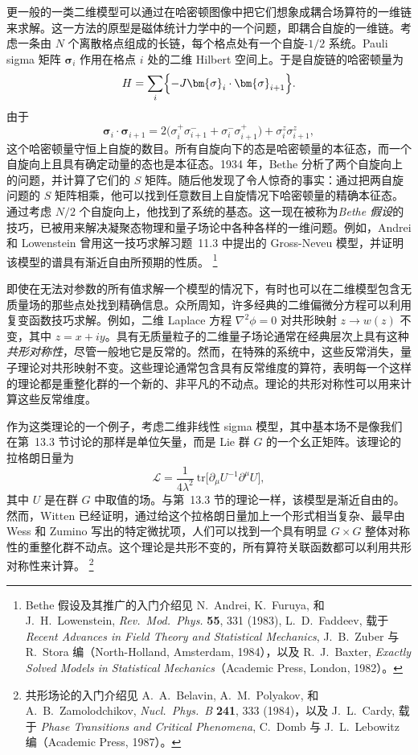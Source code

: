 更一般的一类二维模型可以通过在哈密顿图像中把它们想象成耦合场算符的一维链来求解。这一方法的原型是磁体统计力学中的一个问题，即耦合自旋的一维链。考虑一条由 $N$ 个离散格点组成的长链，每个格点处有一个自旋-$1/2$ 系统。Pauli sigma 矩阵 $\bm{\sigma}_i$ 作用在格点 $i$ 处的二维 Hilbert 空间上。于是自旋链的哈密顿量为
\begin{equation}
  H = \sum_i \Bigl\{ -J\bm{\sigma}_i\cdot\bm{\sigma}_{i+1} \Bigr\} .
  \label{eq:22.15}
\end{equation}
由于
\begin{equation}
  \bm{\sigma}_i\cdot\bm{\sigma}_{i+1} = 2\bigl( \sigma^+_i\sigma^-_{i+1}
    + \sigma^-_i\sigma^+_{i+1} \bigr) + \sigma^z_i\sigma^z_{i+1} ,
  \label{eq:22.16}
\end{equation}
这个哈密顿量守恒上自旋的数目。所有自旋向下的态是哈密顿量的本征态，而一个自旋向上且具有确定动量的态也是本征态。1934 年，Bethe 分析了两个自旋向上的问题，并计算了它们的 $S$ 矩阵。随后他发现了令人惊奇的事实：通过把两自旋问题的 $S$ 矩阵相乘，他可以找到任意数目上自旋情况下哈密顿量的精确本征态。通过考虑 $N/2$ 个自旋向上，他找到了系统的基态。这一现在被称为\emph{Bethe 假设}的技巧，已被用来解决凝聚态物理和量子场论中各种各样的一维问题。例如，Andrei 和 Lowenstein 曾用这一技巧求解习题~11.3 中提出的 Gross-Neveu 模型，并证明该模型的谱具有渐近自由所预期的性质。%
\footnote{Bethe 假设及其推广的入门介绍见 N.~Andrei, K.~Furuya, 和 J.~H.~Lowenstein, \emph{Rev.\ Mod.\ Phys.} \textbf{55}, 331 (1983), L.~D.~Faddeev, 载于 \emph{Recent Advances in Field Theory and Statistical Mechanics}, J.~B.~Zuber 与 R.~Stora 编（North-Holland, Amsterdam, 1984），以及 R.~J.~Baxter, \emph{Exactly Solved Models in Statistical Mechanics}（Academic Press, London, 1982）。}

即使在无法对参数的所有值求解一个模型的情况下，有时也可以在二维模型包含无质量场的那些点处找到精确信息。众所周知，许多经典的二维偏微分方程可以利用复变函数技巧求解。例如，二维 Laplace 方程 $\nabla^2\phi = 0$ 对共形映射 $z\to w(z)$ 不变，其中 $z = x + iy$。具有无质量粒子的二维量子场论通常在经典层次上具有这种\emph{共形对称性}，尽管一般地它是反常的。然而，在特殊的系统中，这些反常消失，量子理论对共形映射不变。这些理论通常包含具有反常维度的算符，表明每一个这样的理论都是重整化群的一个新的、非平凡的不动点。理论的共形对称性可以用来计算这些反常维度。

作为这类理论的一个例子，考虑二维非线性 sigma 模型，其中基本场不是像我们在第~13.3 节讨论的那样是单位矢量，而是 Lie 群 $G$ 的一个幺正矩阵。该理论的拉格朗日量为
\begin{equation}
  \mathcal{L} = \frac{1}{4\lambda^2}\ \mathrm{tr}\bigl[ \partial_\mu U^{-1}
    \partial^\mu U \bigr] ,
  \label{eq:22.17}
\end{equation}
其中 $U$ 是在群 $G$ 中取值的场。与第~13.3 节的理论一样，该模型是渐近自由的。然而，Witten 已经证明，通过给这个拉格朗日量加上一个形式相当复杂、最早由 Wess 和 Zumino 写出的特定微扰项，人们可以找到一个具有明显 $G\times G$ 整体对称性的重整化群不动点。这个理论是共形不变的，所有算符关联函数都可以利用共形对称性来计算。%
\footnote{共形场论的入门介绍见 A.~A.~Belavin, A.~M.~Polyakov, 和 A.~B.~Zamolodchikov, \emph{Nucl.\ Phys.\ B} \textbf{241}, 333 (1984)，以及 J.~L.~Cardy, 载于 \emph{Phase Transitions and Critical Phenomena}, C.~Domb 与 J.~L.~Lebowitz 编（Academic Press, 1987）。}

